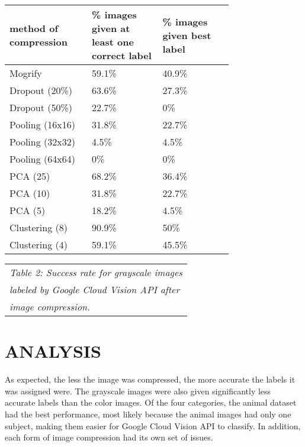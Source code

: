 \documentclass[letterpaper, 10 pt, conference]{ieeeconf}  %
\begin{document}
\bgroup
\def\arraystretch{1.2} %
\begin{tabular}{|p{0.25\linewidth}|p{0.25\linewidth}|p{0.25\linewidth}|}
\hline
{\bf method of compression} & {\bf \% images given at least one correct label}
	& {\bf \% images given best label} \\
\hline
Mogrify & 59.1\% & 40.9\% \\ %
\hline
Dropout (20\%) & 63.6\% & 27.3\% \\ %
\hline
Dropout (50\%) & 22.7\% & 0\% \\ %
\hline
Pooling (16x16) & 31.8\% & 22.7\% \\ %
\hline
Pooling (32x32) & 4.5\% & 4.5\%\\ %
\hline
Pooling (64x64) & 0\% & 0\% \\ %
\hline
PCA (25) & 68.2\% & 36.4\% \\ %
\hline
PCA (10) & 31.8\% & 22.7\% \\ %
\hline
PCA (5) & 18.2\% & 4.5\% \\ %
\hline
Clustering (8) & 90.9\% & 50\% \\ %
\hline
Clustering (4) & 59.1\% & 45.5\% \\ %
\hline
\end{tabular}
\egroup

\vspace*{2mm}
\begin{tabular}{l}
{\it Table 2: Success rate for grayscale images} \\
{\it labeled by Google Cloud Vision API after} \\
{\it image compression.} \\
\end{tabular}

\def\arraystretch{1.0} %

\vspace*{4mm}

\section{ANALYSIS}

As expected, the less the image was compressed, the more accurate
the labels it was assigned were. The grayscale images were also
given significantly less accurate labels than the color images.
Of the four categories, the animal dataset had the best
performance, most likely because the animal images had only
one subject, making them easier for Google Cloud Vision API to classify.
In addition, each form of image
compression had its own set of issues.
\end{document}
